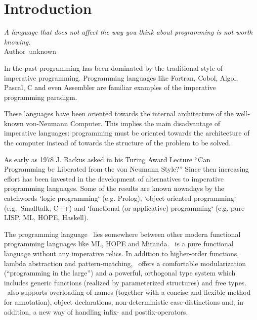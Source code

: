 \chapter{Introduction}
\label{chap:intro}

\hfill\begin{minipage}[t]{7cm}
{\em
A language that does not affect the way you think about programming
is not worth knowing.}\\{\small \mbox{} \hfill \mbox{Author unknown}}
\end{minipage}

\bigskip

In the past programming has been dominated by the traditional style of
imperative programming.
Programming languages like Fortran, Cobol, Algol, Pascal, C and even
Assembler are familiar examples of the imperative 
programming paradigm.

These languages have been oriented towards the internal architecture of the
well-known 
\mbox{von-Neumann} Computer. This implies the main disadvantage of imperative
languages: programming must be oriented towards the architecture of the
computer instead of towards the structure of the problem to be solved.

As early as 1978 J. Backus asked in his Turing Award Lecture ``Can
Programming be Liberated from the von Neumann Style?'' 
Since then increasing effort has been invested in the development of
alternatives to 
imperative programming languages. 
Some of the results are known nowadays by the catchwords `logic
programming` (e.g. Prolog), `object oriented programming` (e.g.\ 
Smalltalk, C++) and `functional (or applicative) programming` (e.g. pure
LISP, ML, HOPE, Haskell).

The programming language \opal\  lies somewhere between  other modern functional
programming languages like ML, HOPE and  Miranda.
\opal\  is a pure functional language without any imperative relics.
In addition to higher-order functions, lambda abstraction and pattern-matching, \opal\ offers a comfortable modularization
(``programming in the large'') and a powerful, orthogonal type system
which includes
generic functions (realized by parameterized structures) and free types. 
 \opal\ also  supports overloading of names (together with a
concise and flexible method for annotation), object declarations,
non-deterministic case-distinctions and, in addition, a new way of
handling infix- and postfix-operators.

